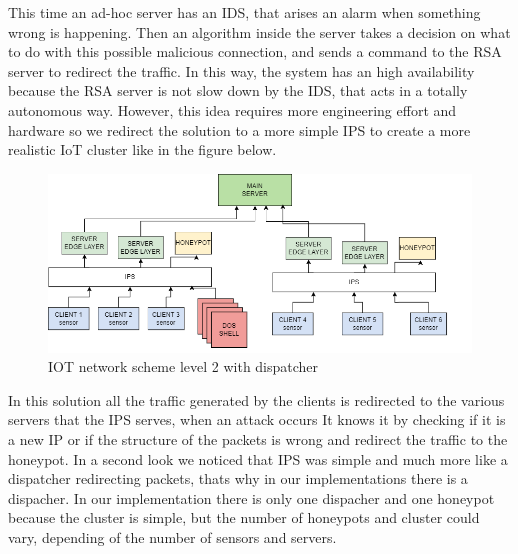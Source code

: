 This time an ad-hoc server has an IDS, that arises an alarm when something wrong is happening. Then an algorithm inside the server takes a decision on what to do with this possible malicious connection, and sends a command to the RSA server to redirect the traffic. In this way, the system has an high availability because the RSA server is not slow down by the IDS, that acts in a totally autonomous way. However, this idea requires more engineering effort and hardware so we redirect the solution to a more simple IPS to create a more realistic IoT cluster like in the figure below. 
\begin{figure}[h!]
  \centering
  \includegraphics[width = 15cm]{images/IOTlevel2IPS.drawio.png}
  \caption{IOT network scheme level 2 with dispatcher}
  \label{fig:3period}
\end{figure}
\FloatBarrier
 In this solution all the traffic generated by the clients is redirected to the various servers that the IPS serves, when an attack occurs It knows it by checking if it is a new IP or if the structure of the packets is wrong and redirect the traffic to the honeypot. 
In a second look we noticed that IPS was simple and much more like a dispatcher redirecting packets, thats why in our implementations there is a dispacher. In our implementation 
there is only one dispacher and one honeypot because the cluster is simple, but the number of honeypots and cluster could vary, depending of the number of sensors and servers.